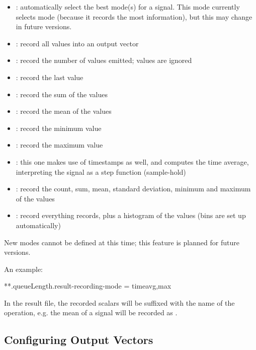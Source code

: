 \begin{itemize}
  \item{}: automatically select the best mode(s) for a signal. This mode
      currently selects  mode (because it records the most
      information), but this may change in future versions.
  \item{}: record all values into an output vector
  \item{}: record the number of values emitted; values are ignored
  \item{}: record the last value
  \item{}: record the sum of the values
  \item{}: record the mean of the values
  \item{}: record the minimum value
  \item{}: record the maximum value
  \item{}: this one makes use of timestamps as well, and computes the
      time average, interpreting the signal as a step function (sample-hold)
  \item{}: record the count, sum, mean, standard deviation, minimum
      and maximum of the values
  \item{}: record everything  records, plus a histogram
      of the values (bins are set up automatically)
\end{itemize}

New modes cannot be defined at this time; this feature is planned for future versions.

An example:

\begin{inifile}
**.queueLength.result-recording-mode = timeavg,max
\end{inifile}

In the result file, the recorded scalars will be suffixed with the name
of the operation, e.g. the mean of a  signal will
be recorded as .



\subsection{Configuring Output Vectors}
\label{sec:ana-sim:vector-config}

